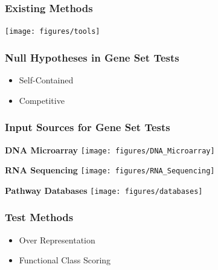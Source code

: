\documentclass[9pt,t]{beamer}
\begin{document}
\begin{frame}[c]
\frametitle{Existing Methods}
	 \centering
	 \vfill
	 \texttt{[image: figures/tools]}
\end{frame}


\begin{frame}
\frametitle{Null Hypotheses in Gene Set Tests}
\begin{itemize}
	\item Self-Contained
	\item Competitive
\end{itemize}
\end{frame}

\begin{frame}
	\frametitle{Input Sources for Gene Set Tests}
	\vspace{0.1cm}
	\begin{minipage}[t]{0.3\textwidth}
	\centering
	{\color{oxygenpurple}\textbf{DNA Microarray}}
	\texttt{[image: figures/DNA\_Microarray]}
	\end{minipage}
	\hspace{0.4cm}
	\begin{minipage}[t]{0.3\textwidth}
	\centering
	{\color{oxygenpurple}\textbf{RNA Sequencing}}
	\vspace{-0.5cm}
	\texttt{[image: figures/RNA\_Sequencing]}
	\end{minipage}
	\hspace{0.2cm}
	\begin{minipage}[t]{0.3\textwidth}
	\centering
	{\color{oxygenpurple}\textbf{Pathway Databases}}
	\vspace{-0.5cm}
	\texttt{[image: figures/databases]}
	\end{minipage}
\end{frame}

\begin{frame}
\frametitle{Test Methods}
		\begin{itemize}
		\item Over Representation
		\item Functional Class Scoring
		\end{itemize}
\end{frame}
\end{document}
